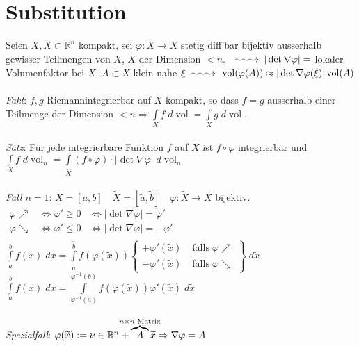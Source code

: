 \documentclass[12pt,a4paper,titlepage]{article}
\makeatletter
\newcommand{\longsquiggly}{\xymatrix{{}\ar@{~>}[r]&{}}}
\newcommand{\setR}{\mathbb{R}}
\newcommand{\vol}{\operatorname{vol}}
\makeatother
\begin{document}
\section*{Substitution}
Seien $X,\widetilde{X}\subset\setR^n$ kompakt, sei $\varphi:\widetilde{X}\to X$ stetig diff'bar bijektiv ausserhalb gewisser Teilmengen von $X$, $\widetilde{X}$ der Dimension $<n$. $\longsquiggly |\det\nabla \varphi|=$ lokaler Volumenfaktor bei $X$. $A\subset X$ klein nahe $\xi \longsquiggly \vol(\varphi(A))\approx|\det\nabla \varphi(\xi)|\vol(A)$\\
\\
\textit{Fakt}: $f,g$ Riemannintegrierbar auf $X$ kompakt, so dass $f=g$ ausserhalb einer Teilmenge der Dimension $<n \Rightarrow \int\limits_Xf \;d\vol=\int\limits_X g \;d\vol$. \\
\\
\textit{Satz}: Für jede integrierbare Funktion $f$ auf $X$ ist $f\circ\varphi$ integrierbar und \\
$\int\limits_Xf \;d\vol_n=\int\limits_{\widetilde{X}}(f\circ\varphi)\cdot|\det\nabla\varphi| \;d\vol_n$ \\
\\
\textit{Fall $n=1$}: $X=[a,b] \quad\widetilde{X}=[\widetilde{a},\widetilde{b}] \quad \varphi:\widetilde{X}\to X$ bijektiv. \\
$\begin{array}{lll}
  \varphi \nearrow &\iff \varphi'\geq 0 &\iff |\det\nabla\varphi|=\varphi' \\
  \varphi \searrow &\iff \varphi'\leq 0 &\iff |\det\nabla\varphi|=-\varphi' \\
\end{array}$ \\
$\int\limits_a^bf(x) \;dx = \int\limits_{\widetilde{a}}^{\widetilde{b}}f(\varphi(\widetilde{x}))\left\{\begin{array}{ll}
    +\varphi'(\widetilde{x}) & \;\text{falls}\; \varphi \nearrow \\
    -\varphi'(\widetilde{x}) & \;\text{falls}\; \varphi \searrow
  \end{array}\right\} \;d\widetilde{x}$ \\
$\int\limits_a^bf(x) \;dx = \int\limits_{\varphi^{-1}(a)}^{\varphi^{-1}(b)}f(\varphi(\widetilde{x}))\varphi'(\widetilde{x}) \;d\widetilde{x}$ \\
\\
\textit{Spezialfall}: $\varphi(\widetilde{x}):=\nu\in\setR^n+\overbrace{A}^{\mathclap{n\times n\text{-Matrix}}}\widetilde{x} \Rightarrow \nabla\varphi=A$ \\
\end{document}
